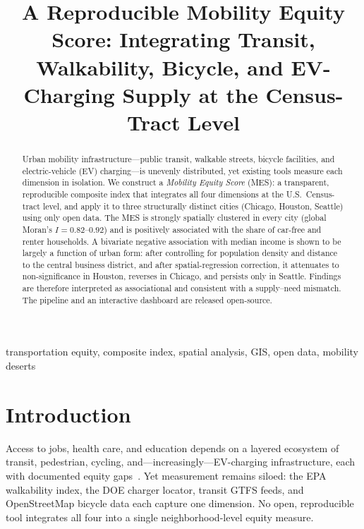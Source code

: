 \documentclass[conference]{IEEEtran}
\begin{document}
\title{A Reproducible Mobility Equity Score: Integrating Transit, Walkability,
Bicycle, and EV-Charging Supply at the Census-Tract Level}

\author{
}

\maketitle

\begin{abstract}
Urban mobility infrastructure---public transit, walkable streets, bicycle
facilities, and electric-vehicle (EV) charging---is unevenly distributed, yet
existing tools measure each dimension in isolation. We construct a
\emph{Mobility Equity Score} (MES): a transparent, reproducible composite index
that integrates all four dimensions at the U.S.\ Census-tract level, and apply
it to three structurally distinct cities (Chicago, Houston, Seattle) using only
open data. The MES is strongly spatially clustered in every city (global
Moran's $I=0.82$--$0.92$) and is positively associated with the share of
car-free and renter households. A bivariate negative association with median
income is shown to be largely a function of urban form: after controlling for
population density and distance to the central business district, and after
spatial-regression correction, it attenuates to non-significance in Houston,
reverses in Chicago, and persists only in Seattle. Findings are therefore
interpreted as associational and consistent with a supply--need mismatch. The
pipeline and an interactive dashboard are released open-source.
\end{abstract}

\begin{IEEEkeywords}
transportation equity, composite index, spatial analysis, GIS, open data,
mobility deserts
\end{IEEEkeywords}

\section{Introduction}
Access to jobs, health care, and education depends on a layered ecosystem of
transit, pedestrian, cycling, and---increasingly---EV-charging infrastructure,
each with documented equity gaps~\cite{aman2020,urban2022,lou2025,ahmed2024}.
Yet measurement remains siloed: the EPA walkability index, the DOE charger
locator, transit GTFS feeds, and OpenStreetMap bicycle data each capture one
dimension. No open, reproducible tool integrates all four into a single
neighborhood-level equity measure.
\end{document}
